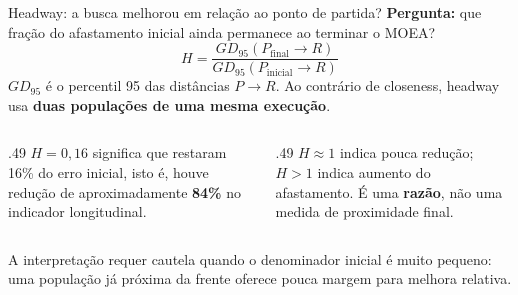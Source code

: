 \begin{frame}{Headway: a busca melhorou em relação ao ponto de partida?}
\textbf{Pergunta:} que fração do afastamento inicial ainda permanece ao terminar o MOEA?
\[
\boxed{\displaystyle H=\frac{GD_{95}(P_{\mathrm{final}}\to R)}{GD_{95}(P_{\mathrm{inicial}}\to R)}}
\]
$GD_{95}$ é o percentil 95 das distâncias $P\to R$. Ao contrário de closeness, headway usa \textbf{duas populações de uma mesma execução}.
\begin{columns}[T,onlytextwidth]
\begin{column}{.49\textwidth}
\textbf{$H=0{,}16$} significa que restaram 16\% do erro inicial, isto é, houve redução de aproximadamente \textbf{84\%} no indicador longitudinal.
\end{column}
\begin{column}{.49\textwidth}
\textbf{$H\approx1$} indica pouca redução; $H>1$ indica aumento do afastamento. É uma \textbf{razão}, não uma medida de proximidade final.
\end{column}
\end{columns}
\vspace{.17cm}
A interpretação requer cautela quando o denominador inicial é muito pequeno: uma população já próxima da frente oferece pouca margem para melhora relativa.
\end{frame}

